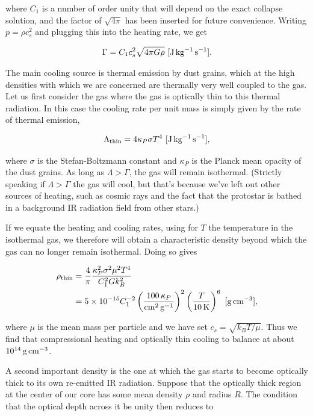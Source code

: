 \documentclass[a4paper,10pt]{article}
\begin{document}
{\noindent}where $C_1$ is a number of order unity that will depend on the exact collapse solution, and the factor of $\sqrt{4\pi}$ has been inserted for future convenience. Writing $p=\rho c_s^2$ and plugging this into the heating rate, we get

\begin{align*}
    \Gamma = C_1c_s^2 \sqrt{4\pi G\rho} ~ [{\rm J\,kg^{-1}\,s^{-1}}].
\end{align*}

{\noindent}The main cooling source is thermal emission by dust grains, which at the high densities with which we are concerned are thermally very well coupled to the gas. Let us first consider the gas where the gas is optically thin to this thermal radiation. In this case the cooling rate per unit mass is simply given by the rate of thermal emission,

\begin{align*}
    \Lambda_{\rm thin} = 4\kappa_P\sigma T^4 ~ [{\rm J\,kg^{-1}\,s^{-1}}],
\end{align*}

{\noindent}where $\sigma$ is the Stefan-Boltzmann constant and $\kappa_P$ is the Planck mean opacity of the dust grains. As long as $\Lambda>\Gamma$, the gas will remain isothermal. (Strictly speaking if $\Lambda>\Gamma$ the gas will cool, but that's because we've left out other sources of heating, such as cosmic rays and the fact that the protostar is bathed in a background IR radiation field from other stars.)

{\noindent}If we equate the heating and cooling rates, using for $T$ the temperature in the isothermal gas, we therefore will obtain a characteristic density beyond which the gas can no longer remain isothermal. Doing so gives

\begin{align*}
    \rho_{\rm thin} &= \frac{4}{\pi} \frac{\kappa_P^2\sigma^2\mu^2T^4}{C_1^2Gk_B^2} \\
    &= 5\times10^{-15} C_1^{-2} \left(\frac{100\,\kappa_P}{{\rm cm^2\,g^{-1}}}\right)^2 \left(\frac{T}{10\,{\rm K}}\right)^6 ~ [{\rm g\,cm^{-3}}],
\end{align*}

{\noindent}where $\mu$ is the mean mass per particle and we have set $c_s=\sqrt{k_BT/\mu}$. Thus we find that compressional heating and optically thin cooling to balance at about $10^{14}\,{\rm g\,cm^{-3}}$.

{\noindent}A second important density is the one at which the gas starts to become optically thick to its own re-emitted IR radiation. Suppose that the optically thick region at the center of our core has some mean density $\rho$ and radius $R$. The condition that the optical depth across it be unity then reduces to
\end{document}
